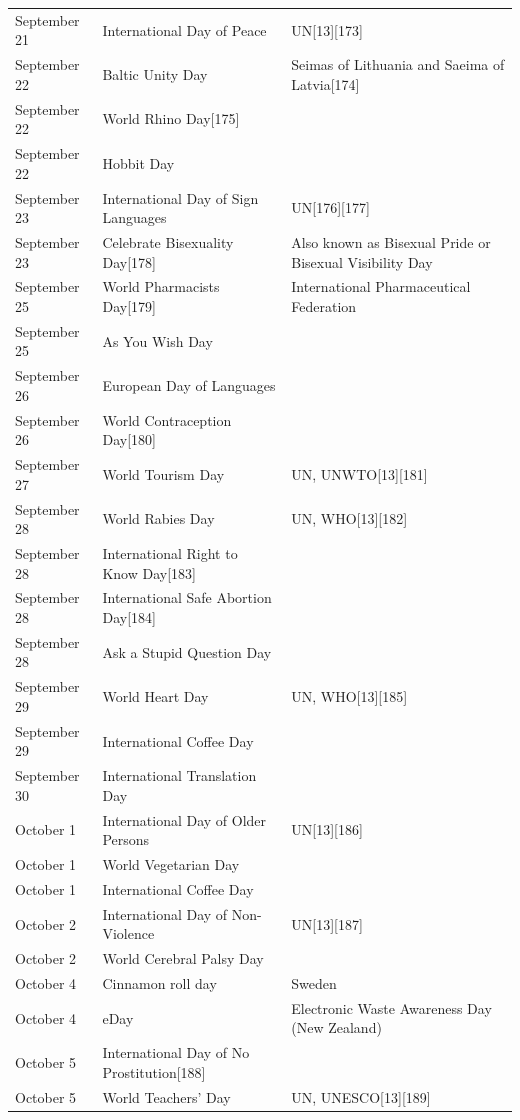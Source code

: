 \documentclass[
]{book}
\begin{document}
\begin{longtable}[t]{>{\raggedright\arraybackslash}p{8em}>{\raggedright\arraybackslash}p{20em}>{\raggedright\arraybackslash}p{12em}}
September 21 & International Day of Peace & UN[13][173]\\
\addlinespace
September 22 & Baltic Unity Day & Seimas of Lithuania and Saeima of Latvia[174]\\
September 22 & World Rhino Day[175] & \\
September 22 & Hobbit Day & \\
September 23 & International Day of Sign Languages & UN[176][177]\\
September 23 & Celebrate Bisexuality Day[178] & Also known as Bisexual Pride or Bisexual Visibility Day\\
\addlinespace
September 25 & World Pharmacists Day[179] & International Pharmaceutical Federation\\
September 25 & As You Wish Day & \\
September 26 & European Day of Languages & \\
September 26 & World Contraception Day[180] & \\
September 27 & World Tourism Day & UN, UNWTO[13][181]\\
\addlinespace
September 28 & World Rabies Day & UN, WHO[13][182]\\
September 28 & International Right to Know Day[183] & \\
September 28 & International Safe Abortion Day[184] & \\
September 28 & Ask a Stupid Question Day & \\
September 29 & World Heart Day & UN, WHO[13][185]\\
\addlinespace
September 29 & International Coffee Day & \\
September 30 & International Translation Day & \\
October 1 & International Day of Older Persons & UN[13][186]\\
October 1 & World Vegetarian Day & \\
October 1 & International Coffee Day & \\
\addlinespace
October 2 & International Day of Non-Violence & UN[13][187]\\
October 2 & World Cerebral Palsy Day & \\
October 4 & Cinnamon roll day & Sweden\\
October 4 & eDay & Electronic Waste Awareness Day (New Zealand)\\
October 5 & International Day of No Prostitution[188] & \\
\addlinespace
October 5 & World Teachers' Day & UN, UNESCO[13][189]\\

\end{longtable}
\end{document}
